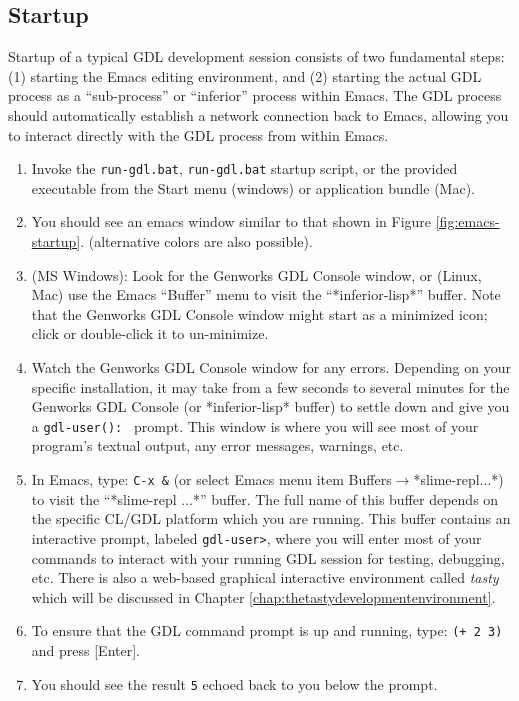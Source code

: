 \documentclass [11pt]{book}
\begin{document}
\subsection{Startup}

\label{subsec:startup}

 Startup of a typical GDL development session consists of
two fundamental steps: (1) starting the Emacs editing environment,
and (2) starting the actual GDL process as a ``sub-process'' or ``inferior'' process 
within Emacs. The GDL process should automatically establish a network connection
back to Emacs, allowing you to interact directly with the GDL process from within Emacs.

\begin{enumerate}

\item Invoke the \texttt{run-gdl.bat}, \texttt{run-gdl.bat}
startup script, or the provided executable from the Start
menu (windows) or application bundle (Mac).

\item You should see an emacs window similar to that shown in Figure 
\ref{fig:emacs-startup}. (alternative colors are also possible).

\item (MS Windows): Look for the Genworks GDL Console
window, or (Linux, Mac) use the Emacs ``Buffer'' menu to visit the
``*inferior-lisp*'' buffer. Note that the Genworks GDL Console
window might start as a minimized icon; click or double-click it to
un-minimize.

\item Watch the Genworks GDL Console window for any
errors. Depending on your specific installation, it may take from a
few seconds to several minutes for the Genworks GDL Console (or
*inferior-lisp* buffer) to settle down and give you a \texttt{gdl-user(): } prompt. This window is where you will see most of your program's textual output, any 
error messages, warnings, etc.

\item In Emacs, type: \texttt{C-x \&} (or select Emacs menu item Buffers$\rightarrow$*slime-repl...*) to visit the ``*slime-repl ...*'' buffer. The full name
of this buffer depends on the specific CL/GDL platform which you are
running. This buffer contains an interactive prompt, labeled \texttt{gdl-user>}, where you will enter most of your commands to interact with your running GDL session
for testing, debugging, etc. There is also a web-based graphical interactive environment called \emph{tasty} which will be discussed in Chapter 
\ref{chap:thetastydevelopmentenvironment}.

\item To ensure that the GDL command prompt is up and running, type: \texttt{(+ 2 3)} and press [Enter].

\item You should see the result \texttt{5} echoed back to you below the prompt.

\end{enumerate}
\end{document}
